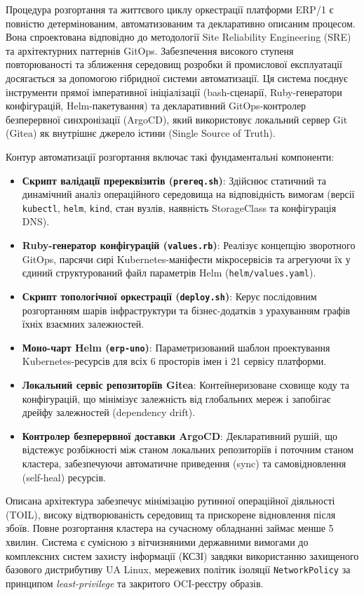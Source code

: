 \documentclass[12pt,a4paper]{article}
\begin{document}
Процедура розгортання та життєвого циклу оркестрації платформи ERP/1 є повністю детермінованим,
автоматизованим та декларативно описаним процесом. Вона спроектована відповідно до методології
Site Reliability Engineering (SRE) та архітектурних паттернів GitOps. Забезпечення високого
ступеня повторюваності та зближення середовищ розробки й промислової експлуатації досягається
за допомогою гібридної системи автоматизації. Ця система поєднує інструменти прямої імперативної
ініціалізації (bash-сценарії, Ruby-генератори конфігурацій, Helm-пакетування) та декларативний
GitOps-контролер безперервної синхронізації (ArgoCD), який використовує локальний сервер
Git (Gitea) як внутрішнє джерело істини (Single Source of Truth).

Контур автоматизації розгортання включає такі фундаментальні компоненти:

\begin{itemize}
    \item \textbf{Скрипт валідації пререквізитів (\texttt{prereq.sh})}: Здійснює статичний та динамічний аналіз операційного середовища на відповідність вимогам (версії \texttt{kubectl}, \texttt{helm}, \texttt{kind}, стан вузлів, наявність StorageClass та конфігурація DNS).
    \item \textbf{Ruby-генератор конфігурацій (\texttt{values.rb})}: Реалізує концепцію зворотного GitOps, парсячи сирі Kubernetes-маніфести мікросервісів та агрегуючи їх у єдиний структурований файл параметрів Helm (\texttt{helm/values.yaml}).
    \item \textbf{Скрипт топологічної оркестрації (\texttt{deploy.sh})}: Керує послідовним розгортанням шарів інфраструктури та бізнес-додатків з урахуванням графів їхніх взаємних залежностей.
    \item \textbf{Моно-чарт Helm (\texttt{erp-uno})}: Параметризований шаблон проектування Kubernetes-ресурсів для всіх 6 просторів імен і 21 сервісу платформи.
    \item \textbf{Локальний сервіс репозиторіїв Gitea}: Контейнеризоване сховище коду та конфігурацій, що мінімізує залежність від глобальних мереж і запобігає дрейфу залежностей (dependency drift).
    \item \textbf{Контролер безперервної доставки ArgoCD}: Декларативний рушій, що відстежує розбіжності між станом локальних репозиторіїв і поточним станом кластера, забезпечуючи автоматичне приведення (sync) та самовідновлення (self-heal) ресурсів.
\end{itemize}

Описана архітектура забезпечує мінімізацію рутинної операційної діяльності (TOIL),
високу відтворюваність середовищ та прискорене відновлення після збоїв. Повне розгортання
кластера на сучасному обладнанні займає менше 5 хвилин. Система є сумісною з вітчизняними
державними вимогами до комплексних систем захисту інформації (КСЗІ) завдяки використанню
захищеного базового дистрибутиву UA Linux, мережевих політик ізоляції \texttt{NetworkPolicy}
за принципом \textit{least-privilege} та закритого OCI-реєстру образів.
\end{document}
